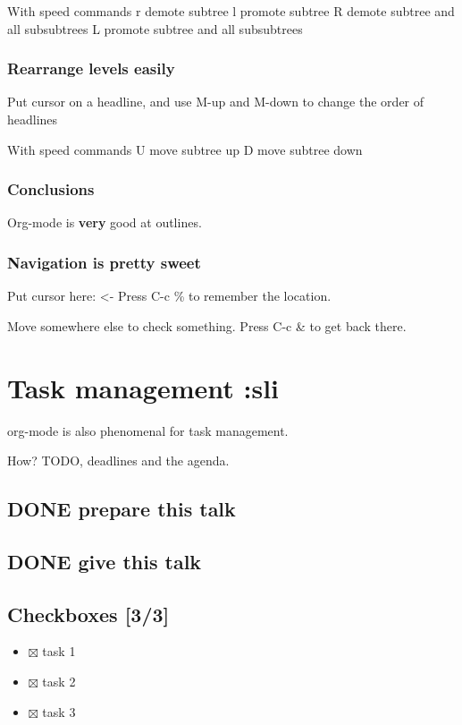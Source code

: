 \documentclass[11pt]{article}
\begin{document}
With speed commands
r demote subtree
l promote subtree
R demote subtree and all subsubtrees
L promote subtree and all subsubtrees

\subsubsection{Rearrange levels easily}
\label{sec-2-2-2}
Put cursor on a headline, and use M-up and M-down to change the order of headlines

With speed commands
U move subtree up
D move subtree down

\subsubsection{Conclusions}
\label{sec-2-2-3}
Org-mode is \textbf{very} good at outlines.

\subsubsection{Navigation is pretty sweet}
\label{sec-2-2-4}
Put cursor here: <- Press C-c \% to remember the location.

Move somewhere else to check something. Press C-c \& to get back there.

\section{Task management                                 :sli}
\label{sec-3}
org-mode is also phenomenal for task management.

How? TODO, deadlines and the agenda.

\subsection{{\bfseries\sffamily DONE} prepare this talk}
\label{sec-3-1}
\subsection{{\bfseries\sffamily DONE} give this talk}
\label{sec-3-2}
\subsection{Checkboxes [3/3]}
\label{sec-3-3}
\begin{itemize}
\item $\boxtimes$ task 1
\item $\boxtimes$ task 2
\item $\boxtimes$ task 3
\end{itemize}
\end{document}

